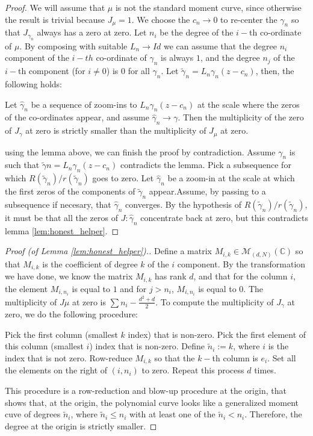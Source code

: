 	\begin{proof}
 		We will assume that $\mu$ is not the standard moment curve, since otherwise the result is trivial because $J_\mu = 1$. We choose the $c_n \to 0$ to re-center the $\gamma_n$ so that $J_{\gamma_n}$ always has a zero at zero. Let $n_i$ be the degree of the $i-$th co-ordinate of $\mu$. By composing with suitable $L_n\to Id$ we can assume that the degree $n_i$ component of the $i-th$ co-ordinate of $\gamma_n$ is always $1$, and the degree $n_j$ of the $i-$th component (for $i\neq 0$) is $0$ for all $\gamma_n$. Let $\tilde \gamma_n = L_n \gamma_n(z-c_n)$, then, the following holds:

 		\begin{lemma}
 		\label{lem:honest_helper}
 			Let $\hat\gamma_n$ be a sequence of zoom-ins to $L_n \gamma_n(z-c_n)$ at the scale where the zeros of the co-ordinates appear, and assume $\hat\gamma_n \to \gamma$. Then the multiplicity of the zero of $J_\gamma$ at zero is strictly smaller than the multiplicity of $J_\mu$ at zero.
 		\end{lemma}

 		using the lemma above, we can finish the proof by contradiction. Assume $ \gamma_n$ is such that $\tilde \gamma n = L_n \gamma_n(z-c_n)$ contradicts the lemma. Pick a subsequence  for which $R(\tilde\gamma_n)/r(\tilde\gamma_n)$ goes to zero. Let $\hat \gamma_n$ be a zoom-in at the scale at which the first zeros of the components of $\tilde\gamma_n$ appear.Assume, by passing to a subsequence if necesary, that $\hat \gamma_n$ converges. By the hypothesis of $R(\tilde\gamma_n)/r(\tilde\gamma_n)$, it must be that all the zeros of $J:{\hat\gamma_n}$ concentrate back at zero, but this contradicts lemma \ref{lem:honest_helper}.
 	\end{proof}
	


	\begin{proof}
		[Proof (of  Lemma \ref{lem:honest_helper}).]
		Define a matrix $M_{i,k} \in \mathcal M_{(d,N)}(\mathbb C)$ so that $M_{i,k}$ is the coefficient of degree $k$ of the $i$ component. By the transformation we have done, we know the matrix $M_{i,k}$ has rank $d$, and that for the column $i$, the element $M_{i,n_i}$ is equal to $1$ and for $j>n_i$, $M_{i,n_i}$ is equal to $0$. The multiplicity of $J\mu$ at zero is $\sum n_i - \frac{d^2+d}{2}$. To compute the multiplicity of $J_\gamma$ at zero, we do the following procedure:

		Pick the first column (smallest $k$ index) that is non-zero. Pick the first element of this column (smallest $i$) index that is non-zero. Define $\tilde n_i:=k$, where $i$ is the index that is not zero. Row-reduce $M_{i,k}$ so that the $k-$th column is $e_i$. Set all the elements on the right of $(i,n_i)$ to zero. Repeat this process $d$ times. 

		This procedure is a row-reduction and blow-up procedure at the origin, that shows that, at the origin, the polynomial curve looks like a generalized moment cuve of degrees $\tilde n_i$, where $\tilde n_i\le n_i$ with at least one of the $\tilde n_i< n_i$. Therefore, the degree at the origin is strictly smaller.
	\end{proof}

